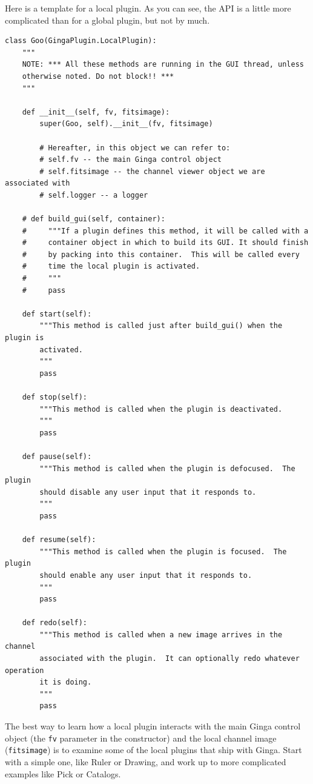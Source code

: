 \documentclass[11pt]{report}
\begin{document}
Here is a template for a local plugin.  As you can see, the API is a
little more complicated than for a global plugin, but not by much.
\begin{lstlisting}
class Goo(GingaPlugin.LocalPlugin):
    """
    NOTE: *** All these methods are running in the GUI thread, unless
    otherwise noted. Do not block!! ***  
    """

    def __init__(self, fv, fitsimage):
        super(Goo, self).__init__(fv, fitsimage)

        # Hereafter, in this object we can refer to:
        # self.fv -- the main Ginga control object
        # self.fitsimage -- the channel viewer object we are associated with
        # self.logger -- a logger

    # def build_gui(self, container):
    #     """If a plugin defines this method, it will be called with a
    #     container object in which to build its GUI. It should finish
    #     by packing into this container.  This will be called every
    #     time the local plugin is activated.
    #     """
    #     pass

    def start(self):
        """This method is called just after build_gui() when the plugin is
        activated.
        """
        pass
        
    def stop(self):
        """This method is called when the plugin is deactivated.
        """
        pass

    def pause(self):
        """This method is called when the plugin is defocused.  The plugin
        should disable any user input that it responds to.
        """
        pass

    def resume(self):
        """This method is called when the plugin is focused.  The plugin
        should enable any user input that it responds to.
        """
        pass

    def redo(self):
        """This method is called when a new image arrives in the channel
        associated with the plugin.  It can optionally redo whatever operation
        it is doing.
        """
        pass
\end{lstlisting}

The best way to learn how a local plugin interacts with the main Ginga
control object (the {\tt fv} parameter in the constructor) and the local
channel image ({\tt fitsimage}) is to examine some of the local plugins
that ship with Ginga.  Start with a simple one, like Ruler or Drawing,
and work up to more complicated examples like Pick or Catalogs.
\end{document}
